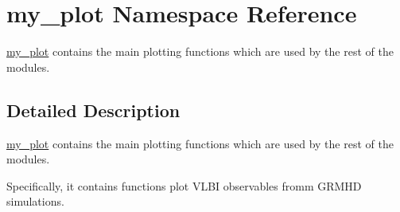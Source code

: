 \hypertarget{namespacemy__plot}{}\section{my\+\_\+plot Namespace Reference}
\label{namespacemy__plot}


\hyperlink{namespacemy__plot}{my\+\_\+plot} contains the main plotting functions which are used by the rest of the modules.  




\subsection{Detailed Description}
\hyperlink{namespacemy__plot}{my\+\_\+plot} contains the main plotting functions which are used by the rest of the modules. 

Specifically, it contains functions plot V\+L\+BI observables fromm G\+R\+M\+HD simulations. 